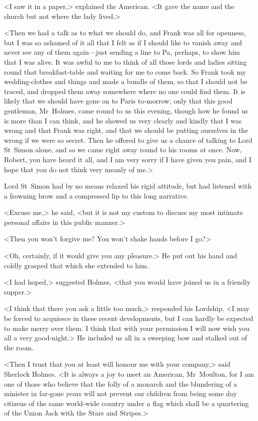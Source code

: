<I saw it in a paper,> explained the American. <It gave the name and the church but not where the lady lived.>

<Then we had a talk as to what we should do, and Frank was all for openness, but I was so ashamed of it all that I felt as if I should like to vanish away and never see any of them again—just sending a line to Pa, perhaps, to show him that I was alive. It was awful to me to think of all those lords and ladies sitting round that breakfast-table and waiting for me to come back. So Frank took my wedding-clothes and things and made a bundle of them, so that I should not be traced, and dropped them away somewhere where no one could find them. It is likely that we should have gone on to Paris to-morrow, only that this good gentleman, Mr~Holmes, came round to us this evening, though how he found us is more than I can think, and he showed us very clearly and kindly that I was wrong and that Frank was right, and that we should be putting ourselves in the wrong if we were so secret. Then he offered to give us a chance of talking to Lord St~Simon alone, and so we came right away round to his rooms at once. Now, Robert, you have heard it all, and I am very sorry if I have given you pain, and I hope that you do not think very meanly of me.>

Lord St~Simon had by no means relaxed his rigid attitude, but had listened with a frowning brow and a compressed lip to this long narrative.

<Excuse me,> he said, <but it is not my custom to discuss my most intimate personal affairs in this public manner.>

<Then you won't forgive me? You won't shake hands before I go?>

<Oh, certainly, if it would give you any pleasure.> He put out his hand and coldly grasped that which she extended to him.

<I had hoped,> suggested Holmes, <that you would have joined us in a friendly supper.>

<I think that there you ask a little too much,> responded his Lordship. <I may be forced to acquiesce in these recent developments, but I can hardly be expected to make merry over them. I think that with your permission I will now wish you all a very good-night.> He included us all in a sweeping bow and stalked out of the room.

<Then I trust that you at least will honour me with your company,> said Sherlock Holmes. <It is always a joy to meet an American, Mr~Moulton, for I am one of those who believe that the folly of a monarch and the blundering of a minister in far-gone years will not prevent our children from being some day citizens of the same world-wide country under a flag which shall be a quartering of the Union Jack with the Stars and Stripes.>

